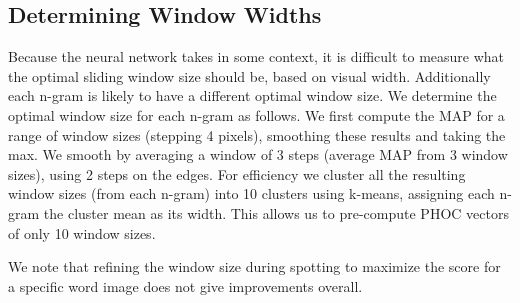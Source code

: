 \documentclass[ms,electronic,twosidetoc,letterpaper,chaptercenter,parttop,lof,lot]{byumsphd}
\begin{document}



\subsection{Determining Window Widths}\label{detirminewindowsize}
Because the neural network takes in some context, it is difficult to measure what the optimal sliding window size should be, based on visual width.
Additionally each n-gram is likely to have a different optimal window size. We determine the optimal window size for each n-gram as follows.
We first compute the MAP for a range of window sizes (stepping 4 pixels), smoothing these results and taking the max. We smooth by averaging a window of 3 steps (average MAP from 3 window sizes), using 2 steps on the edges. For efficiency we cluster all the resulting window sizes (from each n-gram) into 10 clusters using k-means, assigning each n-gram the cluster mean as its width. This allows us to pre-compute PHOC vectors of only 10 window sizes.%

We note that refining the window size during spotting to maximize the score for a specific word image does not give improvements overall.
\end{document}
